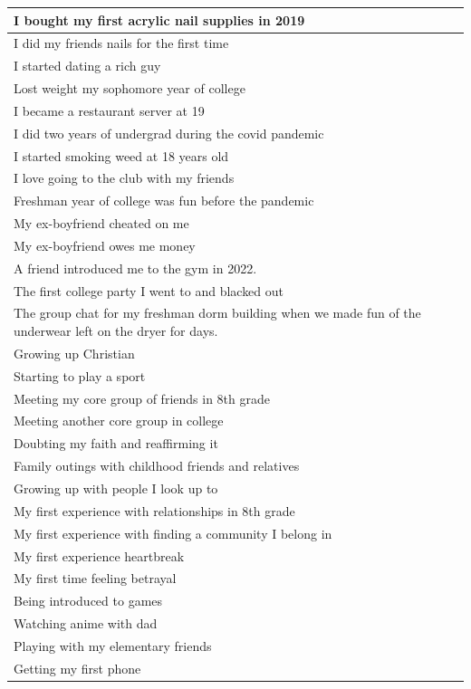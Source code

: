 \documentclass[
  .7em,
  letterpaper,
  DIV=11,
  numbers=noendperiod]{scrartcl}
\begin{document}
\begin{table}
\begin{tabular}{l}
\hline
I bought my first acrylic nail supplies in 2019\\
\hline
I did my friends nails for the first time\\
\hline
I started dating a rich guy\\
\hline
Lost weight my sophomore year of college\\
\hline
I became a restaurant server at 19\\
\hline
I did two years of undergrad during the covid pandemic\\
\hline
I started smoking weed at 18 years old\\
\hline
I love going to the club with my friends\\
\hline
Freshman year of college was fun before the pandemic\\
\hline
My ex-boyfriend cheated on me\\
\hline
My ex-boyfriend owes me money\\
\hline
A friend introduced me to the gym in 2022.\\
\hline
The first college party I went to and blacked out\\
\hline
The group chat for my freshman dorm building when we made fun of the underwear left on the dryer for days.\\
\hline
Growing up Christian\\
\hline
Starting to play a sport\\
\hline
Meeting my core group of friends in 8th grade\\
\hline
Meeting another core group in college\\
\hline
Doubting my faith and reaffirming it\\
\hline
Family outings with childhood friends and relatives\\
\hline
Growing up with people I look up to\\
\hline
My first experience with relationships in 8th grade\\
\hline
My first experience with finding a community I belong in\\
\hline
My first experience heartbreak\\
\hline
My first time feeling betrayal\\
\hline
Being introduced to games\\
\hline
Watching anime with dad\\
\hline
Playing with my elementary friends\\
\hline
Getting my first phone\\
\hline

\end{tabular}
\end{table}
\end{document}
